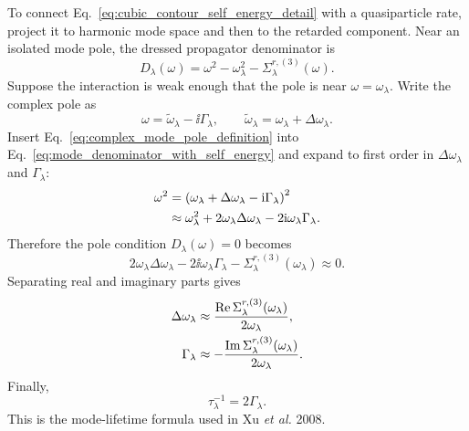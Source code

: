 To connect Eq.~\eqref{eq:cubic_contour_self_energy_detail} with a quasiparticle rate, project it to harmonic mode space and then to the retarded component. Near an isolated mode pole, the dressed propagator denominator is
\begin{equation}
    D_\lambda(\omega) = \omega^2 - \omega_\lambda^2 - \Sigma^{r,(3)}_\lambda(\omega).
    \label{eq:mode_denominator_with_self_energy}
\end{equation}
Suppose the interaction is weak enough that the pole is near $\omega = \omega_\lambda$. Write the complex pole as
\begin{equation}
    \omega = \widetilde\omega_\lambda - \ii\Gamma_\lambda,
    \qquad
    \widetilde\omega_\lambda = \omega_\lambda + \Delta\omega_\lambda.
    \label{eq:complex_mode_pole_definition}
\end{equation}
Insert Eq.~\eqref{eq:complex_mode_pole_definition} into Eq.~\eqref{eq:mode_denominator_with_self_energy} and expand to first order in $\Delta\omega_\lambda$ and $\Gamma_\lambda$:
\begin{align}
    \omega^2
    &= \left( \omega_\lambda + \Delta\omega_\lambda - \mathrm{i}\Gamma_\lambda \right)^2 \\
    &\approx \omega_\lambda^2 + 2\omega_\lambda\Delta\omega_\lambda - 2\mathrm{i}\omega_\lambda\Gamma_\lambda.
\end{align}
Therefore the pole condition $D_\lambda(\omega)=0$ becomes
\begin{equation}
    2\omega_\lambda\Delta\omega_\lambda - 2\ii\omega_\lambda\Gamma_\lambda - \Sigma^{r,(3)}_\lambda(\omega_\lambda) \approx 0.
\end{equation}
Separating real and imaginary parts gives
\begin{align}
    \Delta\omega_\lambda &\approx \frac{\operatorname{Re}\Sigma^{r,(3)}_\lambda(\omega_\lambda)}{2\omega_\lambda}, \\
    \Gamma_\lambda &\approx -\frac{\operatorname{Im}\Sigma^{r,(3)}_\lambda(\omega_\lambda)}{2\omega_\lambda}.
    \label{eq:cubic_shift_and_linewidth_again}
\end{align}
Finally,
\begin{equation}
    \tau_\lambda^{-1} = 2\Gamma_\lambda.
    \label{eq:lifetime_from_linewidth_again}
\end{equation}
This is the mode-lifetime formula used in Xu \emph{et al.} 2008.

